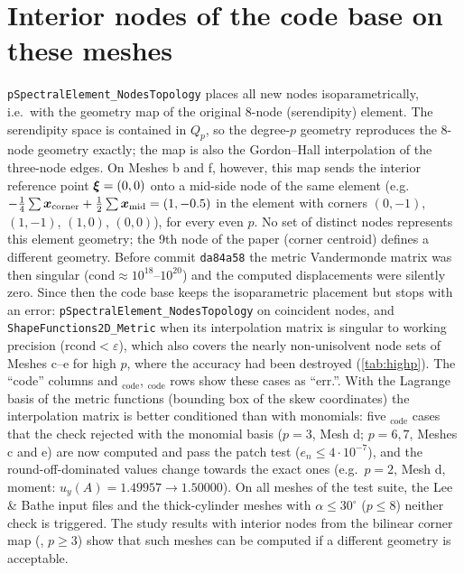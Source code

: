 \documentclass[10pt,a4paper]{article}
\begin{document}
\section{Interior nodes of the code base on these meshes}\label{sec:code}
\texttt{pSpectralElement\_NodesTopology} places all new nodes isoparametrically, i.e.\ with the
geometry map of the original 8-node (serendipity) element. The serendipity space is contained in
$Q_p$, so the degree-$p$ geometry reproduces the 8-node geometry exactly; the map is also the
Gordon--Hall interpolation of the three-node edges. On Meshes b and f, however, this map sends the
interior reference point $\bm{\xi}=(0,0)$ onto a mid-side node of the same element (e.g.\
$-\tfrac14\sum\bm{x}_{\mathrm{corner}}+\tfrac12\sum\bm{x}_{\mathrm{mid}}=(1,-0.5)$ in the element with
corners $(0,-1)$, $(1,-1)$, $(1,0)$, $(0,0)$), for every even $p$. No set of distinct nodes
represents this element geometry; the 9th node of the paper (corner centroid) defines a different
geometry. Before commit \texttt{da84a58} the metric Vandermonde matrix was then singular
($\mathrm{cond}\approx10^{18}$--$10^{20}$) and the computed displacements were silently zero.
Since then the code base keeps the isoparametric placement but stops with an error:
\texttt{pSpectralElement\_NodesTopology} on coincident nodes, and \texttt{ShapeFunctions2D\_Metric}
when its interpolation matrix is singular to working precision ($\mathrm{rcond}<\varepsilon$),
which also covers the nearly non-unisolvent node sets of Meshes c--e for high $p$, where the
accuracy had been destroyed (\cref{tab:highp}). The ``code'' columns and
\PM$_\mathrm{code}$, \PH$_\mathrm{code}$ rows show these cases as ``err.''. With the Lagrange basis
of the metric functions (bounding box of the skew coordinates) the interpolation matrix is better
conditioned than with monomials: five \PM$_\mathrm{code}$ cases that the check rejected with the
monomial basis ($p=3$, Mesh d; $p=6,7$, Meshes c and e) are now computed and pass the patch test
($e_n\le4\cdot10^{-7}$), and the round-off-dominated values change towards the exact ones (e.g.\
$p=2$, Mesh d, moment: $u_y(A)=1.49957\to1.50000$). On all meshes of the test suite, the
Lee \& Bathe input files and the thick-cylinder meshes with $\alpha\le30^\circ$ ($p\le8$) neither
check is triggered. The study results with interior nodes from the bilinear corner map
(\PM, $p\ge3$) show that such meshes can be computed if a different geometry is acceptable.
\end{document}
